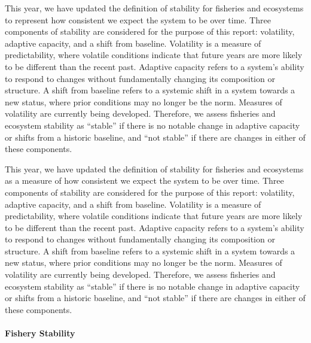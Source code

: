 \documentclass[
  10pt,
]{article}
\begin{document}
This year, we have updated the definition of stability for fisheries and ecosystems to represent how consistent we expect the system to be over time. Three components of stability are considered for the purpose of this report: volatility, adaptive capacity, and a shift from baseline. Volatility is a measure of predictability, where volatile conditions indicate that future years are more likely to be different than the recent past. Adaptive capacity refers to a system's ability to respond to changes without fundamentally changing its composition or structure. A shift from baseline refers to a systemic shift in a system towards a new status, where prior conditions may no longer be the norm. Measures of volatility are currently being developed. Therefore, we assess fisheries and ecosystem stability as ``stable'' if there is no notable change in adaptive capacity or shifts from a historic baseline, and ``not stable'' if there are changes in either of these components.

This year, we have updated the definition of stability for fisheries and ecosystems as a measure of how consistent we expect the system to be over time. Three components of stability are considered for the purpose of this report: volatility, adaptive capacity, and a shift from baseline. Volatility is a measure of predictability, where volatile conditions indicate that future years are more likely to be different than the recent past. Adaptive capacity refers to a system's ability to respond to changes without fundamentally changing its composition or structure. A shift from baseline refers to a systemic shift in a system towards a new status, where prior conditions may no longer be the norm. Measures of volatility are currently being developed. Therefore, we assess fisheries and ecosystem stability as ``stable'' if there is no notable change in adaptive capacity or shifts from a historic baseline, and ``not stable'' if there are changes in either of these components.

\paragraph{Fishery Stability}\label{fishery-stability}
\end{document}
